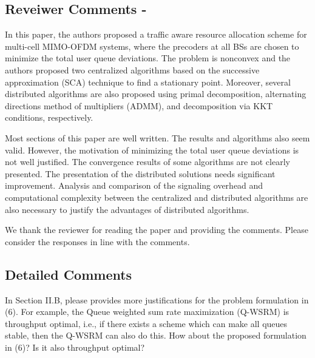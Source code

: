 
\subsection{Reveiwer Comments - }

In this paper, the authors proposed a traffic aware resource allocation scheme for multi-cell MIMO-OFDM systems, where the precoders at all BSs are chosen to minimize the total user queue deviations. The problem is nonconvex and the authors proposed two centralized algorithms based on the successive approximation (SCA) technique to find a stationary point. Moreover, several distributed algorithms are also proposed using primal decomposition, alternating directions method of multipliers (ADMM), and decomposition via KKT conditions, respectively.

Most sections of this paper are well written. The results and algorithms also seem valid. However, the motivation of minimizing the total user queue deviations is not well justified. The convergence results of some algorithms are not clearly presented. The presentation of the distributed solutions needs significant improvement. Analysis and comparison of the signaling overhead and computational complexity between the centralized and distributed algorithms are also necessary to justify the advantages of distributed algorithms.

\resp We thank the reviewer for reading the paper and providing the comments. Please consider the responses in line with the comments.

\subsection*{Detailed Comments}  
 In Section II.B, please provides more justifications for the problem formulation in (6). For example, the Queue weighted sum rate maximization (Q-WSRM) is throughput optimal, i.e., if there exists a scheme which can make all queues stable, then the Q-WSRM can also do this. How about the proposed formulation in (6)? Is it also throughput optimal? 

